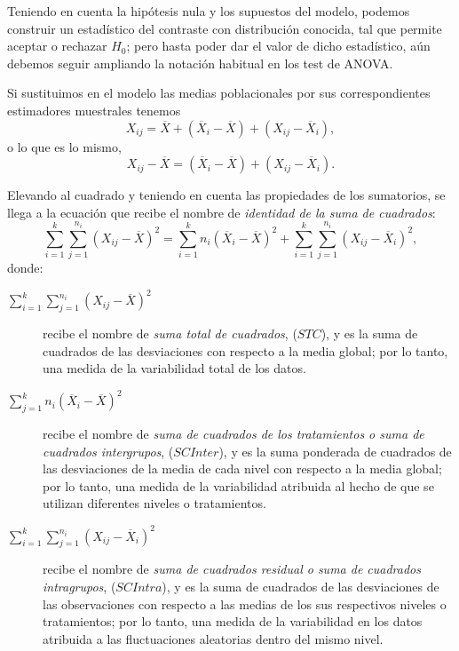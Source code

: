 Teniendo en cuenta la hipótesis nula y los supuestos del modelo, podemos construir un estadístico del contraste con
distribución conocida, tal que permite aceptar o rechazar $H_0$; pero hasta poder dar el valor de dicho estadístico, aún
debemos seguir ampliando la notación habitual en los test de ANOVA.

Si sustituimos en el modelo las medias poblacionales por sus correspondientes estimadores muestrales tenemos
\[
X_{ij}  = \overline X  + \left( {\overline X_i  - \overline X }
\right) + \left( {X_{ij}  - \overline X_i } \right),
\]
o lo que es lo mismo,
\[
X_{ij}- \overline X =   \left( {\overline X_i  - \overline X }
\right) + \left( {X_{ij}  - \overline X_i } \right).
\]

Elevando al cuadrado y teniendo en cuenta las propiedades de los sumatorios, se llega a la ecuación que recibe el nombre
de \emph{identidad de la suma de cuadrados}:
\[
\sum\limits_{i = 1}^k {\sum\limits_{j = 1}^{n_i } {\left( {X_{ij}
- \overline X } \right)^2 } }  = \sum\limits_{i = 1}^k {n_i\left(
{\overline X_i  - \overline X } \right)^2 }  + \sum\limits_{i =
1}^k {\sum\limits_{j = 1}^{n_i } {\left( {X_{ij}  - \overline X_i
} \right)^2 } },
\]
donde:
\begin{description}
\item [$\sum_{i = 1}^k \sum_{j = 1}^{n_i } (X_{ij}- \overline X )^2$] recibe el nombre de \emph{suma total de
cuadrados}, ($STC$), y es la suma de cuadrados de las desviaciones con respecto a la media global; por lo tanto, una
medida de la variabilidad total de los datos.
\item [$\sum_{j = 1}^k n_i (\overline X_i  - \overline X)^2$] recibe el nombre de \emph{suma de cuadrados de los
tratamientos o suma de cuadrados intergrupos}, ($SCInter$), y es la suma ponderada de cuadrados de las desviaciones de
la media de cada nivel con respecto a la media global; por lo tanto, una medida de la variabilidad atribuida al hecho de
que se utilizan diferentes niveles o tratamientos.
\item [$\sum_{i = 1}^k \sum_{j = 1}^{n_i } (X_{ij}- \overline X_i )^2$] recibe el nombre de \emph{suma de cuadrados
residual o suma de cuadrados intragrupos}, ($SCIntra$), y es la suma de cuadrados de las desviaciones de las
observaciones con respecto a las medias de los sus respectivos niveles o tratamientos; por lo tanto, una medida de la
variabilidad en los datos atribuida a las fluctuaciones aleatorias dentro del mismo nivel.
\end{description}

